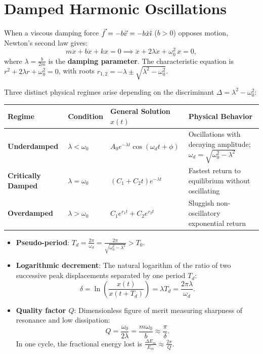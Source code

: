 \section{Damped Harmonic Oscillations}

When a viscous damping force $\vec{f} = -b\vec{v} = -b\dot{x}\hat{\imath}$ ($b > 0$) opposes motion, Newton's second law gives:
\[
m\ddot{x} + b\dot{x} + kx = 0 \implies \boxed{\ddot{x} + 2\lambda\dot{x} + \omega_0^2\,x = 0,}
\]
where $\lambda = \frac{b}{2m}$ is the \textbf{damping parameter}.
The characteristic equation is $r^2 + 2\lambda r + \omega_0^2 = 0$, with roots $r_{1, 2} = -\lambda \pm \sqrt{\lambda^2 - \omega_0^2}$.

Three distinct physical regimes arise depending on the discriminant $\Delta = \lambda^2 - \omega_0^2$:

\begin{center}
\renewcommand{\arraystretch}{1.3}
\begin{tabular}{@{}llll@{}}
\toprule
\textbf{Regime} & \textbf{Condition} & \textbf{General Solution $x(t)$} & \textbf{Physical Behavior} \\
\midrule
\textbf{Underdamped} & $\lambda < \omega_0$ & $A_0 e^{-\lambda t}\cos(\omega_d t + \phi)$ & Oscillations with decaying amplitude; $\omega_d = \sqrt{\omega_0^2 - \lambda^2}$ \\
\textbf{Critically Damped} & $\lambda = \omega_0$ & $(C_1 + C_2 t)e^{-\lambda t}$ & Fastest return to equilibrium without oscillating \\
\textbf{Overdamped} & $\lambda > \omega_0$ & $C_1 e^{r_1 t} + C_2 e^{r_2 t}$ & Sluggish non-oscillatory exponential return \\
\bottomrule
\end{tabular}
\end{center}

\begin{keyidea}
\begin{itemize}[leftmargin=1.4em,itemsep=2pt]
  \item \textbf{Pseudo-period}: $T_d = \frac{2\pi}{\omega_d} = \frac{2\pi}{\sqrt{\omega_0^2 - \lambda^2}} > T_0$.
  \item \textbf{Logarithmic decrement}: The natural logarithm of the ratio of two successive peak displacements separated by one period $T_d$:
        \[
        \boxed{\delta = \ln\left(\frac{x(t)}{x(t + T_d)}\right) = \lambda T_d = \frac{2\pi\lambda}{\omega_d}.}
        \]
  \item \textbf{Quality factor $Q$}: Dimensionless figure of merit measuring sharpness of resonance and low dissipation:
        \[
        \boxed{Q = \frac{\omega_0}{2\lambda} = \frac{m\omega_0}{b} \approx \frac{\pi}{\delta}.}
        \]
        In one cycle, the fractional energy lost is $\frac{\Delta E_m}{E_m} \approx \frac{2\pi}{Q}$.
\end{itemize}
\end{keyidea}

